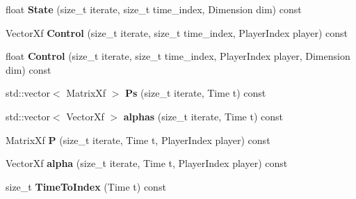 \begin{DoxyCompactItemize}
\item 
float {\bfseries State} (size\+\_\+t iterate, size\+\_\+t time\+\_\+index, Dimension dim) const \hypertarget{classilqgames_1_1_solver_log_a448f9cd63c6b6e889cb8791bc1902305}{}\label{classilqgames_1_1_solver_log_a448f9cd63c6b6e889cb8791bc1902305}

\item 
Vector\+Xf {\bfseries Control} (size\+\_\+t iterate, size\+\_\+t time\+\_\+index, Player\+Index player) const \hypertarget{classilqgames_1_1_solver_log_a7bfdf2a7a7ced357eafcd36e009425d3}{}\label{classilqgames_1_1_solver_log_a7bfdf2a7a7ced357eafcd36e009425d3}

\item 
float {\bfseries Control} (size\+\_\+t iterate, size\+\_\+t time\+\_\+index, Player\+Index player, Dimension dim) const \hypertarget{classilqgames_1_1_solver_log_a73a740dd13e6f8c3c8359294e7662687}{}\label{classilqgames_1_1_solver_log_a73a740dd13e6f8c3c8359294e7662687}

\item 
std\+::vector$<$ Matrix\+Xf $>$ {\bfseries Ps} (size\+\_\+t iterate, Time t) const \hypertarget{classilqgames_1_1_solver_log_ae958cea078e821259eed40c26904bfbf}{}\label{classilqgames_1_1_solver_log_ae958cea078e821259eed40c26904bfbf}

\item 
std\+::vector$<$ Vector\+Xf $>$ {\bfseries alphas} (size\+\_\+t iterate, Time t) const \hypertarget{classilqgames_1_1_solver_log_a995476b2148f34878345d42ab9fbbc53}{}\label{classilqgames_1_1_solver_log_a995476b2148f34878345d42ab9fbbc53}

\item 
Matrix\+Xf {\bfseries P} (size\+\_\+t iterate, Time t, Player\+Index player) const \hypertarget{classilqgames_1_1_solver_log_a9074054ada0fbcc9b59b073d65252dd7}{}\label{classilqgames_1_1_solver_log_a9074054ada0fbcc9b59b073d65252dd7}

\item 
Vector\+Xf {\bfseries alpha} (size\+\_\+t iterate, Time t, Player\+Index player) const \hypertarget{classilqgames_1_1_solver_log_ac621cbe5639cf7ed168677404311efed}{}\label{classilqgames_1_1_solver_log_ac621cbe5639cf7ed168677404311efed}

\item 
size\+\_\+t {\bfseries Time\+To\+Index} (Time t) const \hypertarget{classilqgames_1_1_solver_log_ac4e09ac795276835d047795ff4ebffc7}{}\label{classilqgames_1_1_solver_log_ac4e09ac795276835d047795ff4ebffc7}


\end{DoxyCompactItemize}
